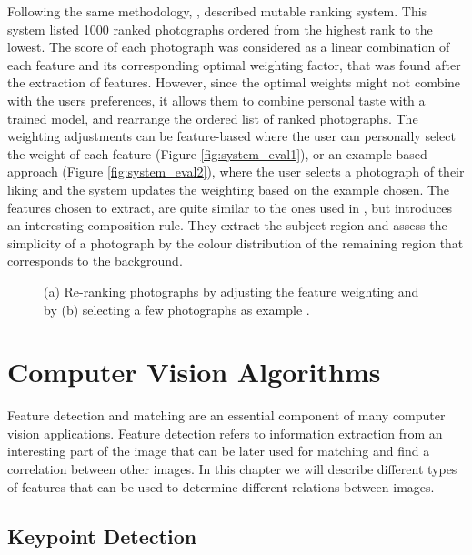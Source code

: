 Following the same methodology, \citeauthor{yeh2010personalized} \cite{yeh2010personalized}, described mutable ranking system. This system listed 1000 ranked photographs ordered from the highest rank to the lowest. The score of each photograph was considered as a linear combination of each feature and its corresponding optimal weighting factor, that was found after the extraction of features. However, since the optimal weights might not combine with the users preferences, it allows them to combine personal taste with a trained model, and rearrange the ordered list of ranked photographs.
The weighting adjustments can be feature-based where the user can personally select the weight of each feature (Figure \ref{fig:system_eval1}), or an example-based approach (Figure \ref{fig:system_eval2}), where the user selects a photograph of their liking and the system updates the weighting based on the example chosen.
The features chosen to extract, are quite similar to the ones used in \cite{datta2006studying}, but introduces an interesting composition rule. They extract the subject region and assess the simplicity of a photograph by the colour distribution of the remaining region that corresponds to the background.

\begin{figure}[htbp]
    \centering
  \caption{(a) Re-ranking photographs by adjusting the feature weighting and by (b) selecting a few photographs as example \cite{yeh2010personalized}.}
  \label{fig:system_eval_image}
\end{figure}

\section{Computer Vision Algorithms}

Feature detection and matching are an essential component of many computer vision applications. Feature detection refers to information extraction from an interesting part of the image that can be later used for matching and find a correlation between other images. In this chapter we will describe different types of features that can be used to determine different relations between images.

\subsection{Keypoint Detection}
\label{sub:keypoint}


